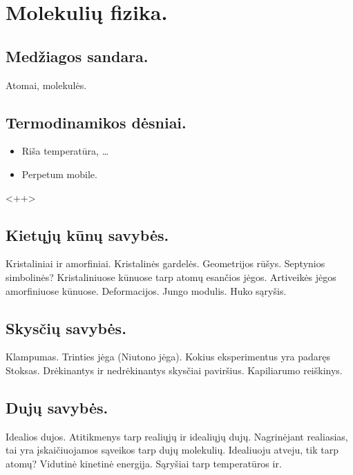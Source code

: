 \chapter{Molekulių fizika.}
\section{Medžiagos sandara.}
Atomai, molekulės.
\section{Termodinamikos dėsniai.}
\begin{itemize}
  \item Riša temperatūra, …
  \item Perpetum mobile.
\end{itemize}<++>
\section{Kietųjų kūnų savybės.}
Kristaliniai ir amorfiniai. Kristalinės gardelės. Geometrijos rūšys.
Septynios simbolinės? Kristaliniuose kūnuose tarp atomų esančios jėgos.
Artiveikės jėgos amorfiniuose kūnuose. Deformacijos. Jungo modulis.
Huko sąryšis.
\section{Skysčių savybės.}
Klampumas. Trinties jėga (Niutono jėga). Kokius eksperimentus yra padaręs
Stoksas. Drėkinantys ir nedrėkinantys skysčiai paviršius. Kapiliarumo
reiškinys.
\section{Dujų savybės.}
Idealios dujos. Atitikmenys tarp realiųjų ir idealiųjų dujų. Nagrinėjant
realiasias, tai yra įskaičiuojamos sąveikos tarp dujų molekulių. Idealiuoju
atveju, tik tarp atomų? Vidutinė kinetinė energija. Sąryšiai tarp
temperatūros ir.
